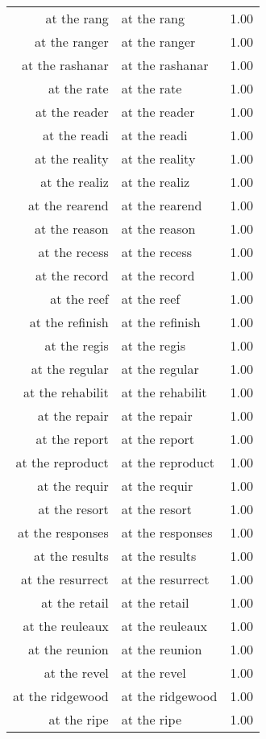 \begin{table}[ht]
\begin{tabular}{rlr}
  at the rang & at the rang & 1.00 \\ 
  at the ranger & at the ranger & 1.00 \\ 
  at the rashanar & at the rashanar & 1.00 \\ 
  at the rate & at the rate & 1.00 \\ 
  at the reader & at the reader & 1.00 \\ 
  at the readi & at the readi & 1.00 \\ 
  at the reality & at the reality & 1.00 \\ 
  at the realiz & at the realiz & 1.00 \\ 
  at the rearend & at the rearend & 1.00 \\ 
  at the reason & at the reason & 1.00 \\ 
  at the recess & at the recess & 1.00 \\ 
  at the record & at the record & 1.00 \\ 
  at the reef & at the reef & 1.00 \\ 
  at the refinish & at the refinish & 1.00 \\ 
  at the regis & at the regis & 1.00 \\ 
  at the regular & at the regular & 1.00 \\ 
  at the rehabilit & at the rehabilit & 1.00 \\ 
  at the repair & at the repair & 1.00 \\ 
  at the report & at the report & 1.00 \\ 
  at the reproduct & at the reproduct & 1.00 \\ 
  at the requir & at the requir & 1.00 \\ 
  at the resort & at the resort & 1.00 \\ 
  at the responses & at the responses & 1.00 \\ 
  at the results & at the results & 1.00 \\ 
  at the resurrect & at the resurrect & 1.00 \\ 
  at the retail & at the retail & 1.00 \\ 
  at the reuleaux & at the reuleaux & 1.00 \\ 
  at the reunion & at the reunion & 1.00 \\ 
  at the revel & at the revel & 1.00 \\ 
  at the ridgewood & at the ridgewood & 1.00 \\ 
  at the ripe & at the ripe & 1.00 \\ 

\end{tabular}
\end{table}
